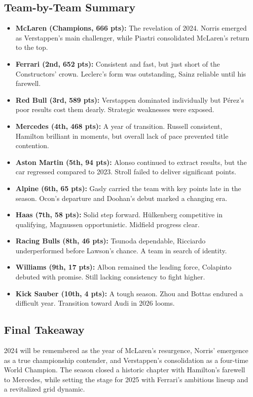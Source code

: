 \documentclass{article}
\begin{document}
\subsection*{Team-by-Team Summary}

\begin{itemize}
    \item \textbf{McLaren (Champions, 666 pts):} The revelation of 2024. Norris emerged as Verstappen’s main challenger, while Piastri consolidated McLaren’s return to the top.
    \item \textbf{Ferrari (2nd, 652 pts):} Consistent and fast, but just short of the Constructors’ crown. Leclerc’s form was outstanding, Sainz reliable until his farewell.
    \item \textbf{Red Bull (3rd, 589 pts):} Verstappen dominated individually but Pérez’s poor results cost them dearly. Strategic weaknesses were exposed.
    \item \textbf{Mercedes (4th, 468 pts):} A year of transition. Russell consistent, Hamilton brilliant in moments, but overall lack of pace prevented title contention.
    \item \textbf{Aston Martin (5th, 94 pts):} Alonso continued to extract results, but the car regressed compared to 2023. Stroll failed to deliver significant points.
    \item \textbf{Alpine (6th, 65 pts):} Gasly carried the team with key points late in the season. Ocon’s departure and Doohan’s debut marked a changing era.
    \item \textbf{Haas (7th, 58 pts):} Solid step forward. Hülkenberg competitive in qualifying, Magnussen opportunistic. Midfield progress clear.
    \item \textbf{Racing Bulls (8th, 46 pts):} Tsunoda dependable, Ricciardo underperformed before Lawson’s chance. A team in search of identity.
    \item \textbf{Williams (9th, 17 pts):} Albon remained the leading force, Colapinto debuted with promise. Still lacking consistency to fight higher.
    \item \textbf{Kick Sauber (10th, 4 pts):} A tough season. Zhou and Bottas endured a difficult year. Transition toward Audi in 2026 looms.
\end{itemize}

\subsection*{Final Takeaway}

2024 will be remembered as the year of McLaren’s resurgence, Norris’ emergence as a true championship contender, and Verstappen’s consolidation as a four-time World Champion. 
The season closed a historic chapter with Hamilton’s farewell to Mercedes, while setting the stage for 2025 with Ferrari’s ambitious lineup and a revitalized grid dynamic.
\end{document}
